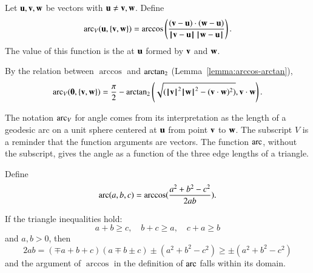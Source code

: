 \begin{definition}\label{def:angle}
Let $\u,\v,\w$ be vectors with $\u\ne \v,\w$.
Define 
    $$
    \arc_V(\u,\{\v,\w\}) = \arccos\left(\frac{(\v-\u)\cdot (\w-\u)}{\norm{\v}{\u}\,\norm{\w}{\u}}\right).
    $$
The value of this function is the  at $\u$ formed by $\v$ and $\w$.
%
%
%
%
%
\end{definition}

By the relation between $\arccos$ and $\atn$
(Lemma~\ref{lemma:arccos-arctan}), %
    \begin{equation}\label{eqn:angle}
    \arc_V(\orz,\{\v,\w\}) = \frac{\pi}2 - \atn\left ({\sqrt{(\normo{\v}^2\normo{\w}^2 -
    (\v\cdot \w)^2)}}, {\v\cdot \w}\right).
    \end{equation}
%

The notation $\arc_V$ for angle comes from its interpretation as the
length of a geodesic arc on a unit sphere
centered at $\u$ from point $\v$ to $\w$.
%
The subscript $V$ is a reminder that
the function arguments are vectors.  The function
$\arc$, without the subscript,  gives the angle as a function
of the three edge lengths of a triangle.
%
%
%


\begin{definition}[arc]\label{def:arc}
Define
 $$\arc(a,b,c) = \arccos(\frac{a^2 + b^2 - c^2}{2 a b}).$$
%
\end{definition}

If the triangle inequalities hold:
$$
a + b \ge c,\quad b + c \ge a, \quad c+a \ge b
$$
and $a,b >0$, then
$$
2 a b = (\mp a+b+c)(a \mp b \pm c) \pm (a^2 + b^2 - c^2) \ge \pm  (a^2 + b^2 - c^2)
$$
and the argument of $\arccos$ in the definition of $\arc$  falls within its domain.

